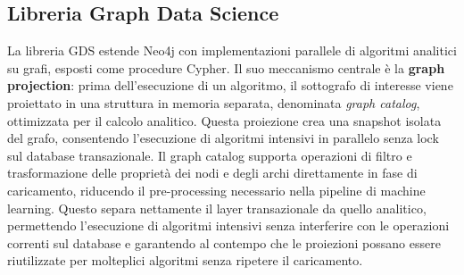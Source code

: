 \subsection{Libreria Graph Data Science}
La libreria GDS estende Neo4j con implementazioni parallele di algoritmi analitici su grafi, esposti come procedure Cypher. Il suo meccanismo centrale è la \textbf{graph projection}: prima dell'esecuzione di un algoritmo, il sottografo di interesse viene proiettato in una struttura in memoria separata, denominata \textit{graph catalog}, ottimizzata per il calcolo analitico. Questa proiezione crea una snapshot isolata del grafo, consentendo l'esecuzione di algoritmi intensivi in parallelo senza lock sul database transazionale. Il graph catalog supporta operazioni di filtro e trasformazione delle proprietà dei nodi e degli archi direttamente in fase di caricamento, riducendo il pre-processing necessario nella pipeline di machine learning. Questo separa nettamente il layer transazionale da quello analitico, permettendo l'esecuzione di algoritmi intensivi senza interferire con le operazioni correnti sul database e garantendo al contempo che le proiezioni possano essere riutilizzate per molteplici algoritmi senza ripetere il caricamento.

